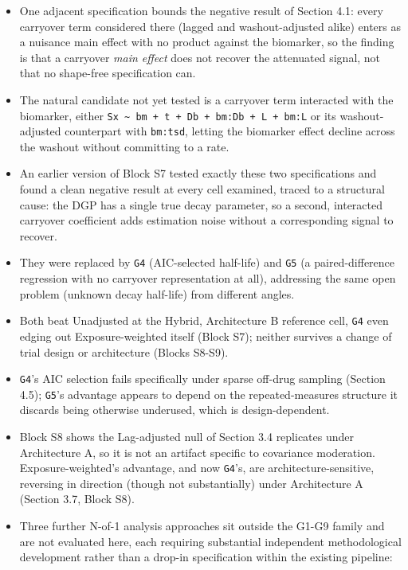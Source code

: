 \documentclass[
  11pt,
]{article}
\providecommand{\tightlist}{%
  \setlength{\itemsep}{0pt}\setlength{\parskip}{0pt}}
\begin{document}
\begin{itemize}
  \begin{itemize}
  \tightlist
  \item
    The exposure-weighted penalty for an incorrect half-life is too
    small to be overtaken (Section 3.7).
  \item
    More fundamentally, the lagged term does not improve on ignoring
    carryover at all (Section 4.1), leaving no advantage for
    decay-shape mis-specification to erode.
  \end{itemize}
\item
  One adjacent specification bounds the negative result of Section
  4.1: every carryover term considered there (lagged and
  washout-adjusted alike) enters as a nuisance main effect with no
  product against the biomarker, so the finding is that a carryover
  \emph{main effect} does not recover the attenuated signal, not that no
  shape-free specification can.
\item
  The natural candidate not yet tested is a carryover term interacted
  with the biomarker, either \texttt{Sx\ \textasciitilde{}\ bm\ +\ t\ +\ Db\ +\ bm:Db\ +\ L\ +\ bm:L} or
  its washout-adjusted counterpart with \texttt{bm:tsd}, letting the
  biomarker effect decline across the washout without committing to a
  rate.
\item
  An earlier version of Block S7 tested exactly these two
  specifications and found a clean negative result at every cell
  examined, traced to a structural cause: the DGP has a single true
  decay parameter, so a second, interacted carryover coefficient adds
  estimation noise without a corresponding signal to recover.
\item
  They were replaced by \texttt{G4} (AIC-selected half-life) and \texttt{G5} (a
  paired-difference regression with no carryover representation at
  all), addressing the same open problem (unknown decay half-life)
  from different angles.
\item
  Both beat Unadjusted at the Hybrid, Architecture B reference cell,
  \texttt{G4} even edging out Exposure-weighted itself (Block S7); neither
  survives a change of trial design or architecture (Blocks S8-S9).
\item
  \texttt{G4}'s AIC selection fails specifically under sparse off-drug
  sampling (Section 4.5); \texttt{G5}'s advantage appears to depend on the
  repeated-measures structure it discards being otherwise underused,
  which is design-dependent.
\item
  Block S8 shows the Lag-adjusted null of Section 3.4 replicates
  under Architecture A, so it is not an artifact specific to
  covariance moderation. Exposure-weighted's advantage, and now
  \texttt{G4}'s, are architecture-sensitive, reversing in direction (though
  not substantially) under Architecture A (Section 3.7, Block S8).
\item
  Three further N-of-1 analysis approaches sit outside the G1-G9
  family and are not evaluated here, each requiring substantial
  independent methodological development rather than a drop-in
  specification within the existing pipeline:


\end{itemize}
\end{document}
